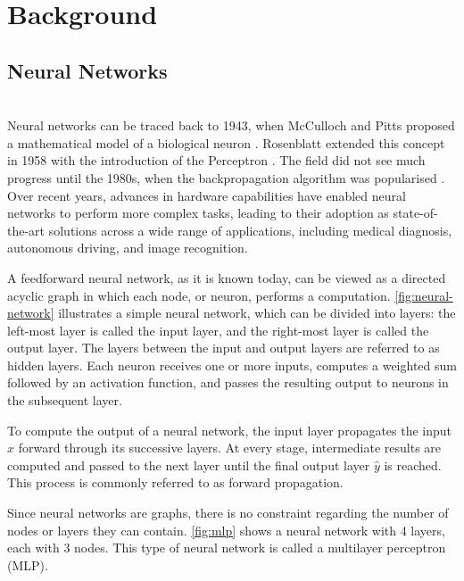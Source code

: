 
\section{Background} \label{sec:background}

\subsection{Neural Networks} \mbox{}\\

Neural networks can be traced back to 1943, when McCulloch and Pitts proposed a mathematical model of a biological neuron \cite{ideas_immanent_in_nervous_activity}. Rosenblatt extended this concept in 1958 with the introduction of the Perceptron \cite{perceptron}. The field did not see much progress until the 1980s, when the backpropagation algorithm was popularised \cite{backpropagation}. Over recent years, advances in hardware capabilities have enabled neural networks to perform more complex tasks, leading to their adoption as state-of-the-art solutions across a wide range of applications, including medical diagnosis, autonomous driving, and image recognition.

A feedforward neural network, as it is known today, can be viewed as a directed acyclic graph in which each node, or neuron, performs a computation. \cref{fig:neural-network} illustrates a simple neural network, which can be divided into layers: the left-most layer is called the input layer, and the right-most layer is called the output layer. The layers between the input and output layers are referred to as hidden layers. Each neuron receives one or more inputs, computes a weighted sum followed by an activation function, and passes the resulting output to neurons in the subsequent layer.

To compute the output of a neural network, the input layer propagates the input $x$ forward through its successive layers. At every stage, intermediate results are computed and passed to the next layer until the final output layer $\hat{y}$ is reached. This process is commonly referred to as forward propagation.



Since neural networks are graphs, there is no constraint regarding the number of nodes or layers they can contain. \autoref{fig:mlp} shows a neural network with 4 layers, each with 3 nodes. This type of neural network is called a multilayer perceptron (MLP).

